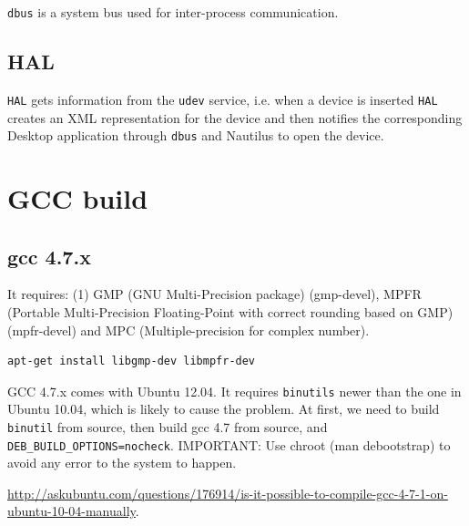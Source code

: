 \verb!dbus! is a system bus used for inter-process communication. 

\subsection{HAL}
\label{sec:HAL}

\verb!HAL! gets information from the \verb!udev! service, i.e. when a device is
inserted \verb!HAL! creates an XML representation for the device and then
notifies the corresponding Desktop application through \verb!dbus! and Nautilus
to open the device.

\section{GCC build}
\label{sec:gcc}

\subsection{gcc 4.7.x}
\label{sec:gcc-4.7.x-build}


It requires: (1) GMP (GNU Multi-Precision package) (gmp-devel), MPFR
(Portable Multi-Precision Floating-Point with correct rounding based on GMP)
(mpfr-devel) and MPC (Multiple-precision for complex number).
\begin{verbatim}
apt-get install libgmp-dev libmpfr-dev
\end{verbatim}

GCC 4.7.x comes with Ubuntu 12.04. It requires \verb!binutils! newer than the
one in Ubuntu 10.04, which is likely to cause the problem. At first, we need to build
\verb!binutil! from source, then build gcc 4.7 from source, and
\verb!DEB_BUILD_OPTIONS=nocheck!. IMPORTANT: Use chroot (man debootstrap) to
avoid any error to the system to happen. 

\url{http://askubuntu.com/questions/176914/is-it-possible-to-compile-gcc-4-7-1-on-ubuntu-10-04-manually}.


